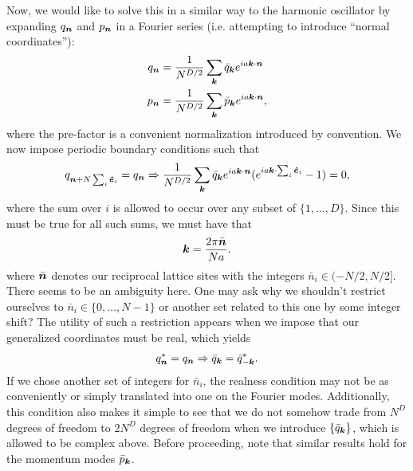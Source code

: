 {Now, we would like to solve this in a similar way to the harmonic oscillator by expanding $q_{\vb*{n}}$ and $p_{\vb*{n}}$ in a Fourier series (i.e. attempting to introduce ``normal coordinates''):
\begin{align}
    q_{\vb*{n}} &= \frac{1}{N^{D/2}} \sum_{\vb*{k}} \bar{q}_{\vb*{k}} e^{i a \vb*{k} \cdot \vb*{n}} \\
    p_{\vb*{n}} &= \frac{1}{N^{D/2}} \sum_{\vb*{k}} \bar{p}_{\vb*{k}} e^{i a \vb*{k} \cdot \vb*{n}}
,\end{align}
where the pre-factor is a convenient normalization introduced by convention.
We now impose periodic boundary conditions such that
\begin{align}
    q_{\vb*{n} + N \sum_{i} \vu*{e}_{i}} = q_{\vb*{n}} \Rightarrow \frac{1}{N^{D/2}} \sum_{\vb*{k}} \bar{q}_{\vb*{k}} e^{ia \vb*{k} \cdot \vb*{n}} ( e^{i a \vb*{k} \cdot \sum_{i} \vu*{e}_{i}} - 1) = 0
,\end{align}
where the sum over $i$ is allowed to occur over any subset of $\{1,\ldots,D\}$.
Since this must be true for all such sums, we must have that
\begin{align}
    \vb*{k} = \frac{2 \pi \bar{\vb*{n}}}{N a}
.\end{align}
where $\bar{\vb*{n}}$ denotes our reciprocal lattice sites with the integers $\bar{n}_{i} \in (-N/2,N/2]$.
There seems to be an ambiguity here. 
One may ask why we shouldn't restrict ourselves to $\bar{n}_{i} \in \{ 0,\ldots,N-1 \}$ or another set related to this one by some integer shift?
The utility of such a restriction appears when we impose that our generalized coordinates must be real, which yields
\begin{align}
    q_{\vb*{n}}^{*} = q_{\vb*{n}} \Rightarrow \bar{q}_{\vb*{k}} = \bar{q}_{-\vb*{k}}^{*}
.\end{align}
If we chose another set of integers for $\bar{n}_{i}$, the realness condition may not be as conveniently or simply translated into one on the Fourier modes.
Additionally, this condition also makes it simple to see that we do not somehow trade from $N^{D}$ degrees of freedom to $2 N^{D}$ degrees of freedom when we introduce $\{ \bar{q}_{\vb*{k}} \}$, which is allowed to be complex above.
Before proceeding, note that similar results hold for the momentum modes $\bar{p}_{\vb*{k}}$.

}
